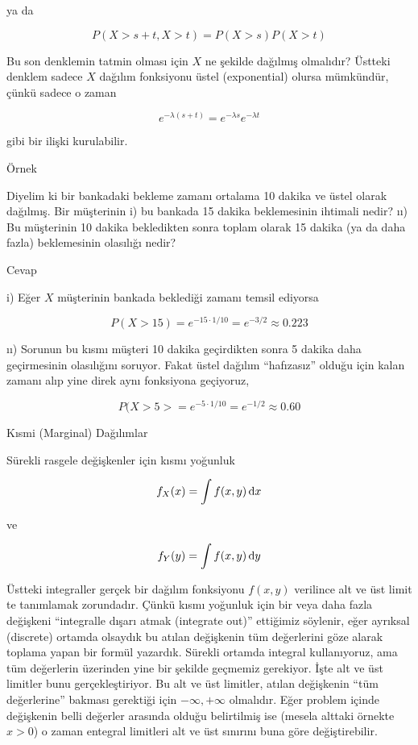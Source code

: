 \documentclass[12pt,fleqn]{article}\usepackage{../../common}
\begin{document}
ya da

$$  P( X>s+t,  X>t ) = P(X>s)P(X>t) $$

Bu son denklemin tatmin olması için $X$ ne şekilde dağılmış olmalıdır?
Üstteki denklem sadece $X$ dağılım fonksiyonu üstel (exponential) olursa
mümkündür, çünkü sadece o zaman

$$ e^{-\lambda(s+t)}  = e^{-\lambda s} e^{-\lambda t}$$

gibi bir ilişki kurulabilir. 

Örnek

Diyelim ki bir bankadaki bekleme zamanı ortalama 10 dakika ve üstel olarak
dağılmış. Bir müşterinin i) bu bankada 15 dakika beklemesinin ihtimali
nedir? ıı) Bu müşterinin 10 dakika bekledikten sonra toplam olarak 15
dakika (ya da daha fazla) beklemesinin olasılığı nedir? 

Cevap

i) Eğer $X$ müşterinin bankada beklediği zamanı temsil ediyorsa

$$ P(X>15) = e^{-15 \cdot 1/10} = e^{-3/2} \approx 0.223 $$

ıı) Sorunun bu kısmı müşteri 10 dakika geçirdikten sonra 5 dakika daha
geçirmesinin olasılığını soruyor. Fakat üstel dağılım ``hafızasız'' olduğu
için kalan zamanı alıp yine direk aynı fonksiyona geçiyoruz, 

$$ P(X>5> = e^{-5 \cdot 1/10} = e^{-1/2} \approx 0.60$$

Kısmi (Marginal) Dağılımlar 

Sürekli rasgele değişkenler için kısmı yoğunluk 

$$ f_X(x) = \int f(x,y) \,\mathrm{d} x $$

ve

$$ f_Y(y) = \int f(x,y) \,\mathrm{d} y $$


Üstteki integraller gerçek bir dağılım fonksiyonu $f(x,y)$ verilince alt ve
üst limit te tanımlamak zorundadır. Çünkü kısmı yoğunluk için bir veya
daha fazla değişkeni ``integralle dışarı atmak (integrate out)'' ettiğimiz
söylenir, eğer ayrıksal (discrete) ortamda olsaydık bu atılan değişkenin
tüm değerlerini göze alarak toplama yapan bir formül yazardık. Sürekli
ortamda integral kullanıyoruz, ama tüm değerlerin üzerinden yine bir
şekilde geçmemiz gerekiyor. İşte alt ve üst limitler bunu
gerçekleştiriyor. Bu alt ve üst limitler, atılan değişkenin ``tüm
değerlerine'' bakması gerektiği için $-\infty,+\infty$ olmalıdır. Eğer
problem içinde değişkenin belli değerler arasında olduğu belirtilmiş ise
(mesela alttaki örnekte $x>0$) o zaman entegral limitleri alt ve üst
sınırını buna göre değiştirebilir. 
\end{document}
